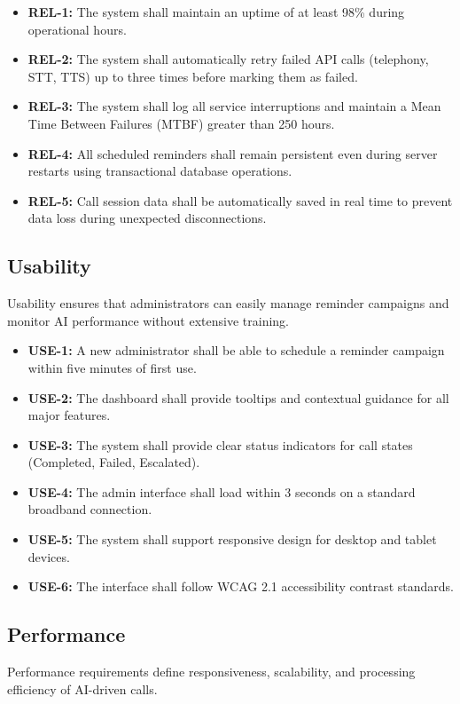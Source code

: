\documentclass[12pt,a4paper]{report}
\begin{document}
\begin{itemize}
\item \textbf{REL-1:} The system shall maintain an uptime of at least 98\% during operational hours.
\item \textbf{REL-2:} The system shall automatically retry failed API calls (telephony, STT, TTS) up to three times before marking them as failed.
\item \textbf{REL-3:} The system shall log all service interruptions and maintain a Mean Time Between Failures (MTBF) greater than 250 hours.
\item \textbf{REL-4:} All scheduled reminders shall remain persistent even during server restarts using transactional database operations.
\item \textbf{REL-5:} Call session data shall be automatically saved in real time to prevent data loss during unexpected disconnections.
\end{itemize}
\subsection{Usability}

Usability ensures that administrators can easily manage reminder campaigns and monitor AI performance without extensive training.

\begin{itemize}
\item \textbf{USE-1:} A new administrator shall be able to schedule a reminder campaign within five minutes of first use.
\item \textbf{USE-2:} The dashboard shall provide tooltips and contextual guidance for all major features.
\item \textbf{USE-3:} The system shall provide clear status indicators for call states (Completed, Failed, Escalated).
\item \textbf{USE-4:} The admin interface shall load within 3 seconds on a standard broadband connection.
\item \textbf{USE-5:} The system shall support responsive design for desktop and tablet devices.
\item \textbf{USE-6:} The interface shall follow WCAG 2.1 accessibility contrast standards.
\end{itemize}
\subsection{Performance}

Performance requirements define responsiveness, scalability, and processing efficiency of AI-driven calls.
\end{document}
